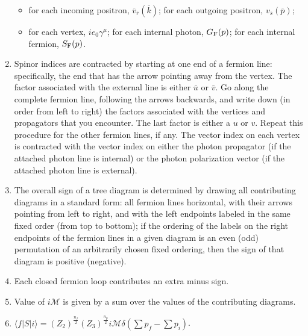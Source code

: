 \begin{enumerate}
\begin{itemize}
\item for each incoming positron, $\overline{v}_{\overline{r}}(\overline{k})$; for each outgoing positron, $v_{\overline{s}}(\overline{p})$;
\item for each vertex, $ie_0 \gamma^{\mu}$;
for each internal photon, $G_{\rm F}(p)$;
for each internal fermion, $S_{\rm F}(p)$.
\end{itemize}
\item Spinor indices are contracted by starting at one end of a fermion line: specifically, the end that has the arrow pointing away from the vertex. The factor associated with the external line is either $\bar{u}$ or $\bar{v}$. Go along the complete fermion line, following the arrows backwards, and write down (in order from left to right) the factors associated with the vertices and propagators that you encounter. The last factor is either a $u$ or $v$. Repeat this procedure for the other fermion lines, if any. The vector index on each vertex is contracted with the vector index on either the photon propagator (if the attached photon line is internal) or the photon polarization vector (if the attached photon line is external).
\item The overall sign of a tree diagram is determined by drawing all contributing diagrams in a standard form: all fermion lines horizontal, with their arrows pointing from left to right, and with the left endpoints labeled in the same fixed order (from top to bottom); if the ordering of the labels on the right endpoints of the fermion lines in a given diagram is an even (odd) permutation of an arbitrarily chosen fixed ordering, then the sign of that diagram is positive (negative).
\item Each closed fermion loop contributes an extra minus sign.
\item Value of $i\mathcal{M}$ is given by a sum over the values of the contributing diagrams.
\item $\langle f | S | i \rangle = (Z_2)^{\frac{n_f}{2}} (Z_3)^{\frac{n_p}{2}} i\mathcal{M}\delta(\sum p_f -\sum p_i)$.
\end{enumerate}

